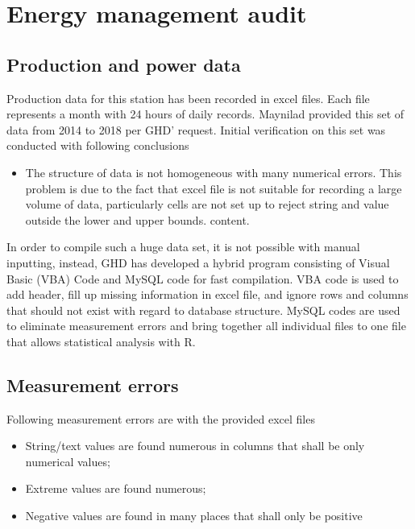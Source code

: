 
\section{Energy management audit}
\label{46}
\subsection{Production and power data}
Production data for this station has been recorded in excel files. Each file represents a month with 24 hours of daily records. Maynilad provided this set of data from 2014 to 2018 per GHD' request. Initial verification on this set was conducted with following conclusions

\begin{itemize}
	\item The structure of data is not homogeneous with many numerical errors. This problem is due to the fact that excel file is not suitable for recording a large volume of data, particularly cells are not set up to reject string and value outside the lower and upper bounds.
	content.
\end{itemize}


In order to compile such a huge data set, it is not possible with manual inputting, instead, GHD has developed a hybrid program consisting of Visual Basic (VBA) Code and MySQL code for fast compilation. VBA code is used to add header, fill up missing information in excel file, and ignore rows and columns that should not exist with regard to database structure. MySQL codes are used to eliminate measurement errors and bring together all individual files to one file that allows statistical analysis with R.
\subsection{Measurement errors}
Following measurement errors are with the provided excel files
\begin{itemize}
\item String/text values are found numerous in columns that shall be only numerical values;
\item Extreme values are found numerous;
\item Negative values are found in many places that shall only be positive
\end{itemize}
